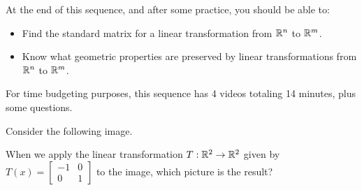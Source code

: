 




At the end of this sequence, and after some practice, you should be able to:

\begin{itemize}
\item Find the standard matrix for a linear transformation from $\mathbb R^n$ to $\mathbb R^m$.   
\item Know what geometric properties are preserved by linear transformations from 
$\mathbb R^n$ to $\mathbb R^m$.  
\end{itemize}

For time budgeting purposes, this sequence has 4 videos totaling 14 minutes, 
plus some questions.  



\endedxtext

\endedxvertical







Consider the following image.  

\begin{center}
 
\end{center}

When we apply the linear transformation $T: \mathbb R^2 \rightarrow \mathbb R^2$ given by $T(x) = \left[ \begin{array}{cc}
-1 & 0 \\ 0 & 1 \end{array} \right]$ to the image, which picture is the result?

\begin{center}
 
\\
 

\end{center}




